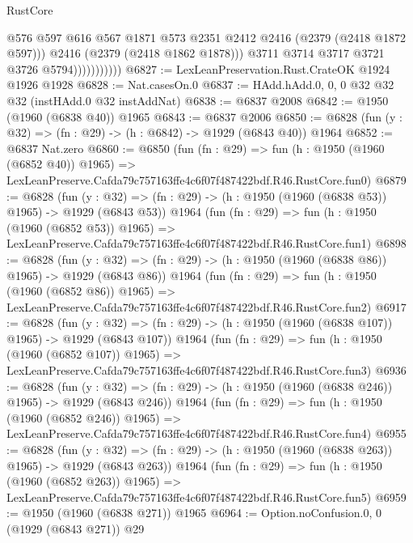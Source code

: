 \begin{lexlean}{RustCore}
\begin{coremodule}
                              @576
                              @597
                              @616
                              @567
                              @1871
                              @573
                              @2351
                              @2412
                              @2416
                              (@2379 (@2418 @1872 @597)))
                            @2416
                            (@2379 (@2418 @1862 @1878)))
                          @3711
                          @3714
                          @3717
                          @3721
                          @3726
                          @5794)))))))))))
@6827 := LexLeanPreservation.Rust.CrateOK @1924 @1926 @1928
@6828 := Nat.casesOn.{0}
@6837 := HAdd.hAdd.{0, 0, 0} @32 @32 @32 (instHAdd.{0} @32 instAddNat)
@6838 := @6837 @2008
@6842 := @1950 (@1960 (@6838 @40)) @1965
@6843 := @6837 @2006
@6850 := @6828 (fun (y : @32) => (fn : @29) -> (h : @6842) -> @1929 (@6843 @40)) @1964
@6852 := @6837 Nat.zero
@6860 := @6850
    (fun (fn : @29) =>
    fun (h : @1950 (@1960 (@6852 @40)) @1965) =>
    LexLeanPreserve.Cafda79c757163ffe4c6f07f487422bdf.R46.RustCore.fun0)
@6879 := @6828
    (fun (y : @32) => (fn : @29) -> (h : @1950 (@1960 (@6838 @53)) @1965) -> @1929 (@6843 @53))
    @1964
    (fun (fn : @29) =>
    fun (h : @1950 (@1960 (@6852 @53)) @1965) =>
    LexLeanPreserve.Cafda79c757163ffe4c6f07f487422bdf.R46.RustCore.fun1)
@6898 := @6828
    (fun (y : @32) => (fn : @29) -> (h : @1950 (@1960 (@6838 @86)) @1965) -> @1929 (@6843 @86))
    @1964
    (fun (fn : @29) =>
    fun (h : @1950 (@1960 (@6852 @86)) @1965) =>
    LexLeanPreserve.Cafda79c757163ffe4c6f07f487422bdf.R46.RustCore.fun2)
@6917 := @6828
    (fun (y : @32) => (fn : @29) -> (h : @1950 (@1960 (@6838 @107)) @1965) -> @1929 (@6843 @107))
    @1964
    (fun (fn : @29) =>
    fun (h : @1950 (@1960 (@6852 @107)) @1965) =>
    LexLeanPreserve.Cafda79c757163ffe4c6f07f487422bdf.R46.RustCore.fun3)
@6936 := @6828
    (fun (y : @32) => (fn : @29) -> (h : @1950 (@1960 (@6838 @246)) @1965) -> @1929 (@6843 @246))
    @1964
    (fun (fn : @29) =>
    fun (h : @1950 (@1960 (@6852 @246)) @1965) =>
    LexLeanPreserve.Cafda79c757163ffe4c6f07f487422bdf.R46.RustCore.fun4)
@6955 := @6828
    (fun (y : @32) => (fn : @29) -> (h : @1950 (@1960 (@6838 @263)) @1965) -> @1929 (@6843 @263))
    @1964
    (fun (fn : @29) =>
    fun (h : @1950 (@1960 (@6852 @263)) @1965) =>
    LexLeanPreserve.Cafda79c757163ffe4c6f07f487422bdf.R46.RustCore.fun5)
@6959 := @1950 (@1960 (@6838 @271)) @1965
@6964 := Option.noConfusion.{0, 0} (@1929 (@6843 @271)) @29

\end{coremodule}
\end{lexlean}

